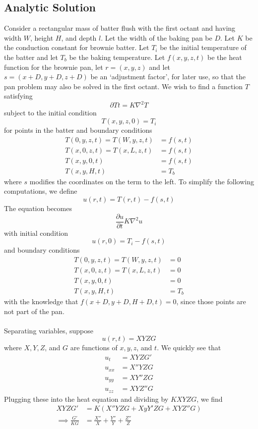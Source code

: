 \documentclass[12pt,draft]{reedmcm}
\begin{document}
\subsection{Analytic Solution} 
Consider a rectangular mass of batter flush with the first octant and having width $W$, height $H$, and depth $l$.  Let the width of the baking pan be $D$.  Let $K$ be the conduction constant for brownie batter.  Let $T_i$ be the initial temperature of the batter and let $T_b$ be the baking temperature.  Let $f(x,y,z,t)$ be the heat function for the brownie pan, let $r = (x,y,z)$ and let $s = (x + D, y+D, z+D)$ be an `adjustment factor', for later use, so  that the pan problem may also be solved in the first octant.  We wish to find a function $T$ satisfying
\[\partial{T}{t} = K \nabla^2 T\]
subject to the initial condition
\[T(x,y,z,0) = T_i\]
for points in the batter and boundary conditions \begin{align*}
T(0,y,z,t) = T(W,y,z,t) &= f(s,t)\\
T(x,0,z,t) = T(x,L,z,t) &= f(s,t)\\
T(x,y,0,t) &= f(s,t)\\
T(x,y,H,t) &= T_b \end{align*}
where $s$ modifies the coordinates on the term to the left.
To simplify the following computations, we define
\[u(r,t) = T(r,t) - f(s,t)\]
The equation becomes 
\[\frac{\partial u}{\partial t} K \nabla^2 u\]
with initial condition
\[u(r,0) = T_i - f(s,t)\]
and boundary conditions \begin{align*}
T(0,y,z,t) = T(W,y,z,t) &= 0\\
T(x,0,z,t) = T(x,L,z,t) &= 0\\
T(x,y,0,t) &= 0\\
T(x,y,H,t) &= T_b\end{align*}
with the knowledge that $f(x+D, y+D, H+D, t) = 0$, since those points are not part of the pan.\\
\\
Separating variables, suppose
\[u(r,t) = XYZG\]
where $X,Y,Z$, and $G$ are functions of $x,y,z$, and $t$.  We quickly see that \begin{align*}
u_t &= XYZG'\\
u_{xx} &= X''YZG\\
u_{yy} &= XY''ZG\\
u_{zz} &= XYZ''G \end{align*}
Plugging these into the heat equation and dividing by $KXYZG$, we find \begin{align*}
XYZG' &= K(X''YZG +XyY'ZG + XYZ''G)\\
\implies \frac{G'}{KG}  &= \frac{X''}{X} + \frac{Y''}{Y} + \frac{Z''}{Z} \end{align*}
\end{document}
